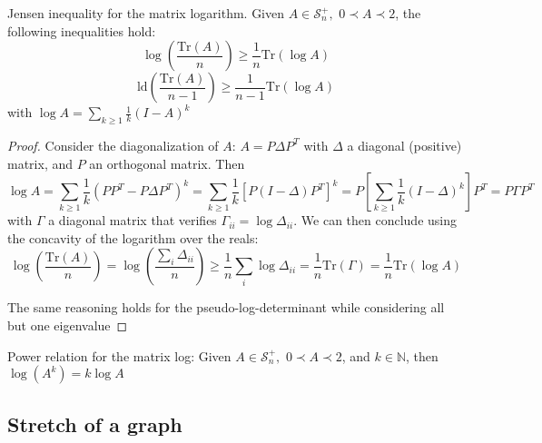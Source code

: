 \begin{lemma} \label{lem:Jensen-inequality-matrix-logarithm}Jensen
inequality for the matrix logarithm. Given $A\in\mathcal{S}_{n}^{+},$
$0\prec A\prec2$, the following inequalities hold: 
\[
\log\left(\frac{\text{Tr}\left(A\right)}{n}\right)\geq\frac{1}{n}\text{Tr}\left(\log A\right)
\]
\[
\text{ld}\left(\frac{\text{Tr}\left(A\right)}{n-1}\right)\geq\frac{1}{n-1}\text{Tr}\left(\log A\right)
\]
with $\log A=\sum_{k\geq1}\frac{1}{k}\left(I-A\right)^{k}$\end{lemma}
\begin{proof} Consider the diagonalization of $A$: $A=P\Delta P^{T}$
with $\Delta$ a diagonal (positive) matrix, and $P$ an orthogonal
matrix. Then 
\[
\log A=\sum_{k\geq1}\frac{1}{k}\left(PP^{T}-P\Delta P^{T}\right)^{k}=\sum_{k\geq1}\frac{1}{k}\left[P\left(I-\Delta\right)P^{T}\right]^{k}=P\left[\sum_{k\geq1}\frac{1}{k}\left(I-\Delta\right)^{k}\right]P^{T}=P\Gamma P^{T}
\]
with $\Gamma$ a diagonal matrix that verifies $\Gamma_{ii}=\log\Delta_{ii}$.
We can then conclude using the concavity of the logarithm over the
reals: 
\[
\log\left(\frac{\text{Tr}\left(A\right)}{n}\right)=\log\left(\frac{\sum_{i}\Delta_{ii}}{n}\right)\geq\frac{1}{n}\sum_{i}\log\Delta_{ii}=\frac{1}{n}\text{Tr}\left(\Gamma\right)=\frac{1}{n}\text{Tr}\left(\log A\right)
\]


The same reasoning holds for the pseudo-log-determinant while considering
all but one eigenvalue\end{proof} \begin{lemma} Power relation for
the matrix log: Given $A\in\mathcal{S}_{n}^{+},$ $0\prec A\prec2$,
and $k\in\mathbb{N}$, then $\log\left(A^{k}\right)=k\log A$ \end{lemma}


\subsection{Stretch of a graph\label{sub:Stretch-graph}}

